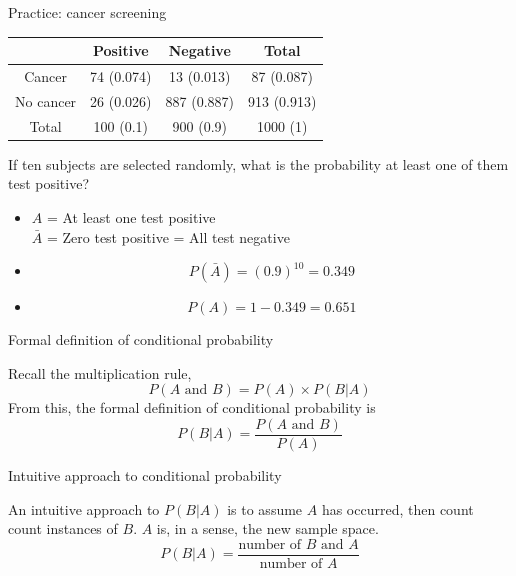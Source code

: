 \documentclass[xcolor=table, handout]{beamer}
\begin{document}
\begin{frame}{Practice: cancer screening}
\begin{block}{}
{\centering \renewcommand{\arraystretch}{1}
\begin{tabular}{c | c  c | c}
 & Positive & Negative & Total \\
\hline
Cancer & 74 (0.074) & 13 (0.013) & 87 (0.087)\\
No cancer & 26 (0.026) & 887 (0.887) & 913 (0.913)\\
\hline
Total & 100 (0.1) & 900 (0.9) & 1000 (1)
\end{tabular}\par
\renewcommand{\arraystretch}{1.5}
}
\end{block}

\begin{exampleblock}{}
If ten subjects are selected randomly, what is the probability at least one of them test positive?
\begin{itemize}
\pause
\item $A$ = At least one test positive\\
$\bar A$ = Zero test positive = All test negative
\pause
\item  
\[P(\bar A) = (0.9)^{10} = 0.349\]
\vspace*{-\baselineskip}\pause
\item  
\[P(A) = 1 - 0.349  = 0.651\]
\end{itemize}
\end{exampleblock}

\end{frame}

\begin{frame}{Formal definition of conditional probability}

\begin{block}{}
Recall the multiplication rule,
\[P(A \text{ and } B) = P(A) \times P(B|A)\]
\pause
From this, the formal definition of conditional probability is
\[P(B|A) = \frac {P(A \text{ and } B)}{P(A)}\] 
\end{block}
\end{frame}

\begin{frame}{Intuitive approach to conditional probability}

\begin{block}{}
An intuitive approach to $P(B|A)$ is to assume $A$ has occurred, then count count instances of $B$. $A$ is, in a sense, the new sample space.
\[ P(B|A) = \frac{\text{number of $B$ and $A$}}{\text{number of $A$}}\]
\end{block}
\end{frame}
\end{document}
